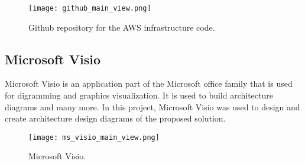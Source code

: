 \begin{figure}[H]
    \centering \texttt{[image: github\_main\_view.png]}
    \caption{Github repository for the AWS infrastructure code.}
    \label{fig:github}
\end{figure}

\subsection{Microsoft Visio}
\label{subsec:ms-visio}
Microsoft Visio is an application part of the Microsoft office family that is used for digramming and graphics visualization. It is used to build architecture diagrams and many more. In this project, Microsoft Visio was used to design and create architecture design diagrams of the proposed solution.

\begin{figure}[H]
    \centering \texttt{[image: ms\_visio\_main\_view.png]}
    \caption{Microsoft Visio.}
    \label{fig:ms-visio}
\end{figure}


